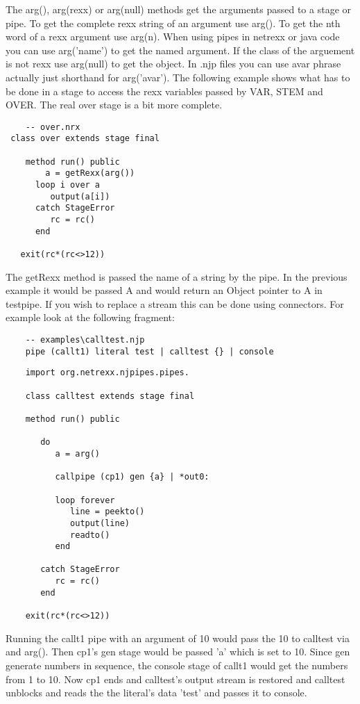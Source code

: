 The arg(), arg(rexx) or arg(null) methods get the arguments passed to a stage or pipe.  To get the complete rexx string of an argument use arg(). To get the nth word of a rexx argument use arg(n).  When using pipes in netrexx or java code you can use arg('name') to get the named argument. If the class of the arguement is not rexx use arg(null) to get the object.
In .njp files you can use {avar} phrase actually just shorthand for  arg('avar').
The following example shows what has to be done in a stage to access the rexx variables passed by VAR, STEM and OVER.  The real  over stage is a bit more complete.
\begin{lstlisting}
    -- over.nrx
 class over extends stage final

    method run() public
        a = getRexx(arg())
      loop i over a
         output(a[i])
      catch StageError
         rc = rc()
      end
    
   exit(rc*(rc<>12))
\end{lstlisting}
 The getRexx method is passed the name of a string by the pipe.  In the previous example it would be passed A and would return an Object pointer to A in testpipe. If you wish to replace a stream this can be done using connectors.  For example look at the following fragment:
\begin{verbatim}
    -- examples\calltest.njp
    pipe (callt1) literal test | calltest {} | console
\end{verbatim}
\begin{lstlisting}
    import org.netrexx.njpipes.pipes.

    class calltest extends stage final

    method run() public

       do
          a = arg()

          callpipe (cp1) gen {a} | *out0:

          loop forever
             line = peekto()
             output(line)
             readto()
          end

       catch StageError
          rc = rc()
       end

    exit(rc*(rc<>12))
\end{lstlisting}
Running the callt1 pipe with an argument of 10 would pass the 10 to calltest via {} and arg().  Then cp1's gen stage would be passed 'a' which is set to 10.  Since gen generate numbers in sequence, the console stage of callt1 would get the numbers from 1 to 10.  Now cp1 ends and calltest's output stream is restored and calltest unblocks and reads the the literal's data 'test' and passes it to console.

